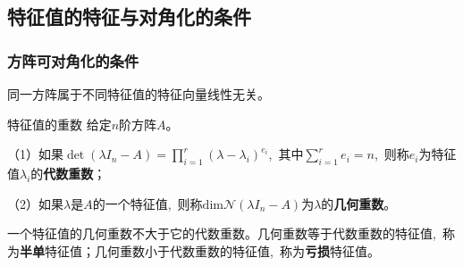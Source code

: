 \documentclass[10pt, a4paper, oneside, fontset=none]{ctexart}
\theoremstyle{plain}
\theoremstyle{definition}
\newcommand{\com}{,\,\,\,\:}
\newcommand{\de}[2][]{\begin{defil}{#1}\kai #2\end{defil}}
\newcommand{\di}[2][]{\begin{theo}{#1}\run #2\end{theo}}
\newcommand{\tboba}[1]{\textbf{\kai\color{bali!75!black}#1}}
\begin{document}
\subsection{特征值的特征与对角化的条件}
\subsubsection{方阵可对角化的条件}
\di[]{
    同一方阵属于不同特征值的特征向量线性无关。
}
\de[特征值的重数]{
    给定$n$阶方阵$A$。

    （1）如果$\det(\lambda I_n - A) = \prod\limits_{i=1}^{r} (\lambda - \lambda_i)^{e_i}$\com 其中$\sum\limits_{i=1}^{r} e_i = n$\com 则称$e_i$为特征值$\lambda_i$的\tboba{代数重数}；

    （2）如果$\lambda$是$A$的一个特征值\com 则称$\mathrm{dim}\mathcal{N}(\lambda I_n - A)$为$\lambda$的\tboba{几何重数}。
}
一个特征值的几何重数不大于它的代数重数。几何重数等于代数重数的特征值\com 称为\tboba{半单}特征值；几何重数小于代数重数的特征值\com 称为\tboba{亏损}特征值。
\end{document}
